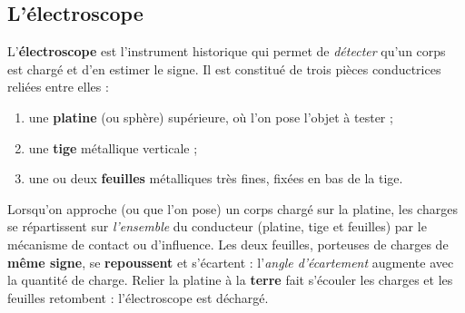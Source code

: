 \documentclass[11pt,a4paper]{article}
\begin{document}
\subsection{L'électroscope}

\begin{definition}[électroscope]
L'\textbf{électroscope} est l'instrument historique qui permet de \emph{détecter} qu'un corps est
chargé et d'en estimer le signe. Il est constitué de trois pièces conductrices reliées entre elles :
\begin{enumerate}[leftmargin=1.8em,topsep=2pt,itemsep=1pt]
  \item une \textbf{platine} (ou sphère) supérieure, où l'on pose l'objet à tester ;
  \item une \textbf{tige} métallique verticale ;
  \item une ou deux \textbf{feuilles} métalliques très fines, fixées en bas de la tige.
\end{enumerate}
\end{definition}

\begin{center}
\end{center}

\begin{theoreme}
Lorsqu'on approche (ou que l'on pose) un corps chargé sur la platine, les charges se répartissent
sur \emph{l'ensemble} du conducteur (platine, tige et feuilles) par le mécanisme de contact ou
d'influence. Les deux feuilles, porteuses de charges de \textbf{même signe}, se \textbf{repoussent}
et s'écartent : l'\emph{angle d'écartement} augmente avec la quantité de charge. Relier la platine
à la \textbf{terre} fait s'écouler les charges et les feuilles retombent : l'électroscope est
déchargé.
\end{theoreme}
\end{document}
